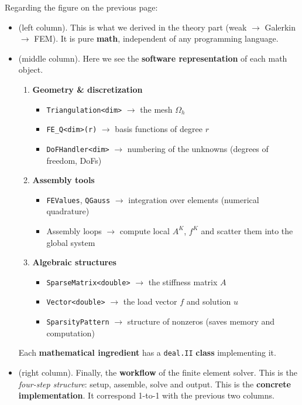 \newpage

\noindent
Regarding the figure on the previous page:
\begin{itemize}
    \item {} (left column). This is what we derived in the theory part (weak $\rightarrow$ Galerkin $\rightarrow$ FEM). It is pure \textbf{math}, independent of any programming language.
    
    \item {} (middle column). Here we see the \textbf{software representation} of each math object.
    \begin{enumerate}
        \item \textbf{Geometry \& discretization}
        \begin{itemize}
            \item \texttt{Triangulation<dim>} $\rightarrow$ the mesh $\Omega_h$
            \item \texttt{FE\_Q<dim>(r)} $\rightarrow$ basis functions of degree $r$
            \item \texttt{DoFHandler<dim>} $\rightarrow$ numbering of the unknowns (degrees of freedom, DoFs)
        \end{itemize}
        \item \textbf{Assembly tools}
        \begin{itemize}
            \item \texttt{FEValues}, \texttt{QGauss} $\rightarrow$ integration over elements (numerical qua\-drature)
            \item Assembly loops $\rightarrow$ compute local $A^K$, $f^K$ and scatter them into the global system
        \end{itemize}
        \item \textbf{Algebraic structures}
        \begin{itemize}
            \item \texttt{SparseMatrix<double>} $\rightarrow$ the stiffness matrix $A$
            \item \texttt{Vector<double>} $\rightarrow$ the load vector $f$ and solution $u$
            \item \texttt{SparsityPattern} $\rightarrow$ structure of nonzeros (saves memory and computation)
        \end{itemize}
    \end{enumerate}
    Each \textbf{mathematical ingredient} has a \texttt{deal.II} \textbf{class} implementing it.
    
    \item {} (right column). Finally, the \textbf{workflow} of the finite element solver. This is the \emph{four-step structure}: setup, assemble, solve and output. This is the \textbf{concrete implementation}. It correspond 1-to-1 with the previous two columns.
\end{itemize}